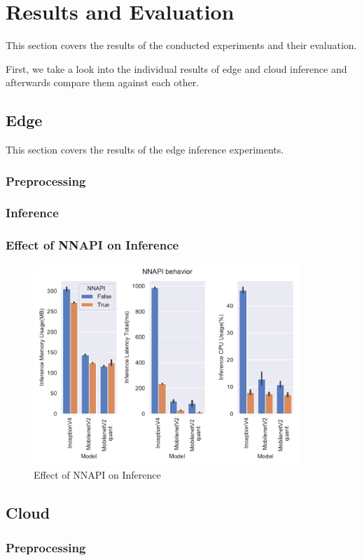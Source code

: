\section{Results and Evaluation}
This section covers the results of the conducted experiments and their evaluation.

First, we take a look into the individual results of edge and cloud inference and afterwards compare them against each other. 
\subsection{Edge}
This section covers the results of the edge inference experiments.
\subsubsection{Preprocessing}
\subsubsection{Inference}
\subsubsection{Effect of NNAPI on Inference}
\begin{figure}[H]
\centering
\includegraphics[width=0.9\textwidth]{./Bilder/single_plots/edge_inference_plots/NNAPI_behavior.pdf}
\caption{Effect of NNAPI on Inference}
\label{fig:NNAPI}
\end{figure}
\subsection{Cloud}
\subsubsection{Preprocessing}

